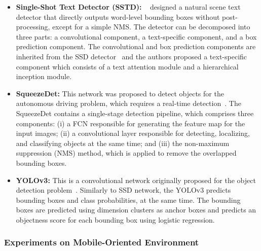 \begin{itemize}
\begin{itemize}
\item {\bf Single-Shot Text Detector (SSTD):} ~\cite{He2017ICCV} designed a natural scene text detector that directly outputs word-level bounding boxes without post-processing, except for a simple NMS. The detector can be decomposed into three parts: a convolutional component, a text-specific component, and a box prediction component. The convolutional and box prediction components are inherited from the SSD detector~\cite{Liu2016ECCV} and the authors proposed a text-specific component which consists of a text attention module and a hierarchical inception module.

\item {\bf SqueezeDet:} This network was proposed to detect objects for the autonomous driving problem, which requires a real-time detection~\cite{Wu2017CVPRW}. The SqueezeDet contains a single-stage detection 
pipeline, which comprises three components: (i) a FCN responsible for generating the feature map for the input images; (ii)  a convolutional layer responsible for detecting, localizing, and classifying objects at the same time; and (iii) the non-maximum suppression (NMS) method, which is applied to remove the overlapped bounding boxes.

\item {\bf YOLOv3:} This is a convolutional network originally proposed for the object detection problem~\cite{Redmon2018CoRR}. Similarly to SSD network, the YOLOv3 predicts bounding boxes and class probabilities, at the same time. The bounding boxes are predicted using dimension clusters as anchor boxes and predicts an objectness score for each bounding box using logistic regression.

\end{itemize}

\end{itemize}

\subsubsection{Experiments on Mobile-Oriented Environment}

